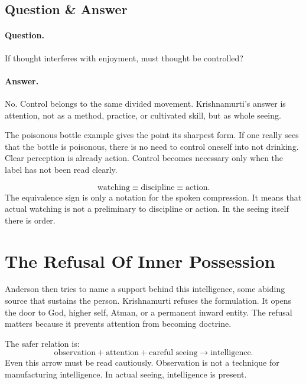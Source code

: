 \documentclass[11pt,oneside]{book}
\begin{document}
\subsection{Question \& Answer}

\paragraph{Question.}
If thought interferes with enjoyment, must thought be controlled?

\paragraph{Answer.}
No. Control belongs to the same divided movement. Krishnamurti's answer is attention, not as a method, practice, or cultivated skill, but as whole seeing.

The poisonous bottle example gives the point its sharpest form. If one really sees that the bottle is poisonous, there is no need to control oneself into not drinking. Clear perception is already action. Control becomes necessary only when the label has not been read clearly.

\begin{equation}
\text{watching} \equiv \text{discipline} \equiv \text{action}.
\end{equation}
The equivalence sign is only a notation for the spoken compression. It means that actual watching is not a preliminary to discipline or action. In the seeing itself there is order.

\section{The Refusal Of Inner Possession}

Anderson then tries to name a support behind this intelligence, some abiding source that sustains the person. Krishnamurti refuses the formulation. It opens the door to God, higher self, Atman, or a permanent inward entity. The refusal matters because it prevents attention from becoming doctrine.

The safer relation is:
\begin{equation}
\text{observation} + \text{attention} + \text{careful seeing}
\longrightarrow
\text{intelligence}.
\end{equation}
Even this arrow must be read cautiously. Observation is not a technique for manufacturing intelligence. In actual seeing, intelligence is present.
\end{document}
